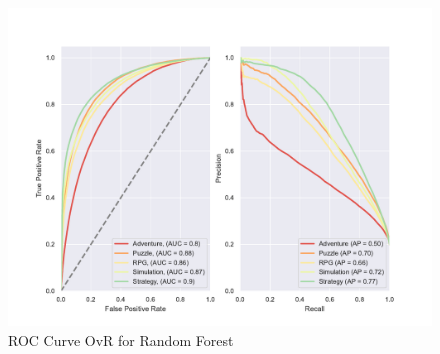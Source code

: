 \begin{figure}
    \centering
    \includegraphics[width=\textwidth]{data/results/plots/random_forest_roc}
    \caption{ROC Curve OvR for Random Forest}
    \label{fig:random_forest_roc}
\end{figure}